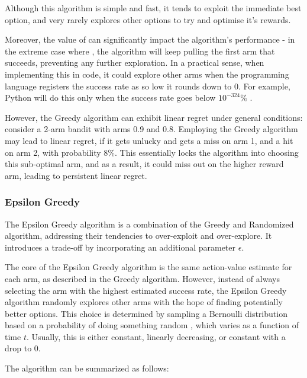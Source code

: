 Although this algorithm is simple and fast, it tends to exploit the immediate best option, and very rarely explores other options to try and optimise it's rewards.

Moreover, the value of \actionValueEstimate \space can significantly impact the algorithm's performance - in the extreme case where , the algorithm will keep pulling the first arm that succeeds, preventing any further exploration.
In a practical sense, when implementing this in code, it could explore other arms when the programming language registers the success rate as so low it rounds down to 0.
For example, Python will do this only when the success rate goes below $10^{-324}\%$ \cite{python_min_float}.

However, the Greedy algorithm can exhibit linear regret under general conditions: consider a 2-arm bandit with arms 0.9 and 0.8. Employing the Greedy algorithm may lead to linear regret, if it gets unlucky and gets a miss on arm 1, and a hit on arm 2, with probability 8\%. This essentially locks the algorithm into choosing this sub-optimal arm, and as a result, it could miss out on the higher reward arm, leading to persistent linear regret.

\subsubsection{Epsilon Greedy}
\label{sec:EpsilonGreedy}
The Epsilon Greedy algorithm is a combination of the Greedy and Randomized algorithm, addressing their tendencies to over-exploit and over-explore. It introduces a trade-off by incorporating an additional parameter $\epsilon$.

The core of the Epsilon Greedy algorithm is the same action-value estimate for each arm, as described in the Greedy algorithm. However, instead of always selecting the arm with the highest estimated success rate, the Epsilon Greedy algorithm randomly explores other arms with the hope of finding potentially better options. This choice is determined by sampling a Bernoulli distribution based on a probability of doing something random \epsilonFunction, which varies as a function of time $t$. Usually, this is either constant, linearly decreasing, or constant with a drop to 0.


The algorithm can be summarized as follows:

